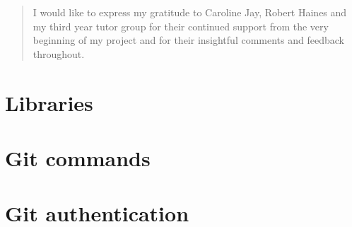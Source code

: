 \documentclass[a4paper]{report}
\begin{document}
\newcommand{\fig}[4]{

\begin{figure} 
    \centering
    \texttt{[image: \#1]}
    \caption{#2}
    \label{#3}
\end{figure}


}
\newcommand{\figh}[4]{

\begin{figure} [ht!]
    \centering
    \texttt{[image: \#1]}
    \caption{#2}
    \label{#3}
\end{figure}


}




\begin{abstract}

\end{abstract}

\renewcommand{\abstractname}{Acknowledgements}
\begin{abstract}
I would like to express my gratitude to Caroline Jay, Robert Haines and my third year tutor group for their continued support from the very beginning of my project and for their insightful comments and feedback throughout.

\end{abstract}

\tableofcontents







\begin{appendices}

\chapter{Libraries}\label{appendix_libraries}



\chapter{Git commands}\label{appendix_plumbing}



\chapter{Git authentication}\label{appendix_gitauth}




\end{appendices}



\end{document}

